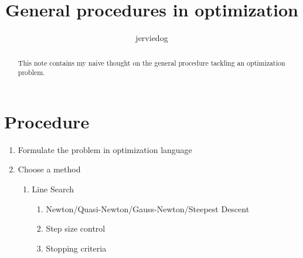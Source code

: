\documentclass[11pt]{article}
\begin{document}
\title{General procedures in optimization}
\author{jerviedog}

\maketitle

\begin{abstract}
  This note contains my naive thought on the general procedure tackling an optimization problem.
\end{abstract}

\section{Procedure}
\begin{enumerate}
\item Formulate the problem in optimization language
\item Choose a method
  \begin{enumerate}
  \item Line Search
    \begin{enumerate}
    \item Newton/Quasi-Newton/Gauss-Newton/Steepest Descent
    \item Step size control
    \item Stopping criteria
    \end{enumerate}
  \end{enumerate}
\end{enumerate}
\end{document}
